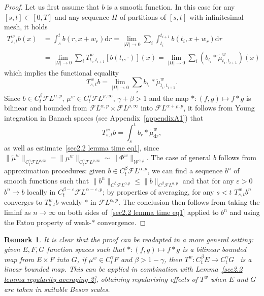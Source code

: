 \documentclass[10pt]{article}
\newcommand{\mathd}{\mathrm{d}}
\newtheorem{remark}[theorem]{Remark}
\begin{document}
\begin{proof}
  Let us first assume that $b$ is a smooth function. In this case for any $[s,
  t] \subset [0, T]$ and any sequence $\Pi$ of partitions of $[s, t]$ with
  infinitesimal mesh, it holds
  \begin{align*}
    T^w_{s, t} b (x) & = \int_s^t b (r, x + w_r) \mathd r = \lim_{| \Pi |
    \rightarrow 0} \sum_i \int_{t_i}^{t_{i + 1}} b (t_i, x + w_r) \mathd r\\
    & = \lim_{| \Pi | \rightarrow 0} \sum_i T^w_{t_i, t_{i + 1}} [b (t_i,
    \cdot)] (x) = \lim_{| \Pi | \rightarrow 0} \sum_i (b_{t_i} \ast
    \tilde{\mu}^w_{t_i, t_{i + 1}}) (x)
  \end{align*}
  which implies the functional equality
  \[ T^w_{s, t} b = \lim_{| \Pi | \rightarrow 0} \sum_i b_{t_i} \ast
     \tilde{\mu}^w_{t_i, t_{i + 1}} . \]
  Since $b \in C^{\beta}_t \mathcal{F} L^{\alpha, p}$, $\mu^w \in C^{\gamma}_t
  \mathcal{F} L^{\rho, \infty}$, $\gamma + \beta > 1$ and the map $\ast : (f,
  g) \mapsto f \ast g$ is bilinear and bounded from $\mathcal{F} L^{\alpha, p}
  \times \mathcal{F} L^{\rho, \infty}$ into $\mathcal{F} L^{\alpha + \rho,
  p}$, it follows from Young integration in Banach spaces (see
  Appendix~\ref{appendixA1}) that
  \[ T^w_{s, t} b = \int_s^t b_r \ast \tilde{\mu}^w_{\mathd r}, \]
  as well as estimate~\eqref{sec2.2 lemma time eq1}, since $\| \tilde{\mu}^w
  \|_{C^{\gamma}_t \mathcal{F} L^{\rho, \infty}} = \| \mu^w \|_{C^{\gamma}_t
  \mathcal{F} L^{\rho, \infty}} \sim \| \Phi^w \|_{\mathcal{W}^{\gamma,
  \rho}}$. The case of general $b$ follows from approximation procedures:
  given $b \in C^{\beta}_t \mathcal{F} L^{\alpha, p}$, we can find a sequence
  $b^n$ of smooth functions such that $\| b^n \|_{C^{\beta} \mathcal{F}
  L^{\alpha, p}} \leqslant \| b \|_{C^{\beta} \mathcal{F} L^{\alpha, p}}$ and
  that for any $\varepsilon > 0$ $b^n \rightarrow b$ locally in $C^{\beta -
  \varepsilon}_t \mathcal{F} L^{\alpha - \varepsilon, p}$; by properties of
  averaging, for any $s < t$ $T^w_{s, t} b^n$ converges to $T^w_{s, t} b$
  weakly\mbox{-}$\ast$ in $\mathcal{F} L^{\alpha, p}$. The conclusion then
  follows from taking the liminf as $n \rightarrow \infty$ on both sides
  of~\eqref{sec2.2 lemma time eq1} applied to $b^n$ and using the Fatou
  property of weak\mbox{-}$\ast$ convergence.
\end{proof}

\begin{remark}
  \label{sec2.2 remark averaging time}It is clear that the proof can be
  readapted in a more general setting: given $E, F, G$ function spaces such
  that $\ast : (f, g) \mapsto f \ast g$ is a bilinear bounded map from $E
  \times F$ into $G$, if $\mu^w \in C^{\gamma}_t F$ and $\beta > 1 - \gamma$,
  then $T^w : C^{\beta}_t E \rightarrow C^{\gamma}_t G$ \ is a linear bounded
  map. This can be applied in combination with Lemma~\ref{sec2.2 lemma
  regularity averaging 2}, obtaining regularising effects of $T^w$ when $E$
  and $G$ are taken in suitable Besov scales.
\end{remark}
\end{document}
